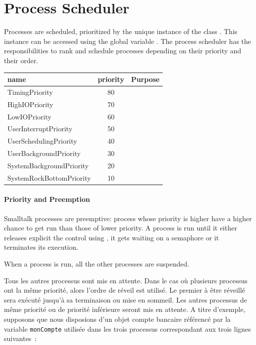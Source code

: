 \documentclass[a4paper,10pt,twoside]{book}
\begin{document}
\section{Process Scheduler}

Processes are scheduled, \ie prioritized by the unique instance of the class . This instance can be accessed using the global variable
. The process scheduler has the responsibilities to rank and schedule processes depending on their priority and their order.

\begin{table}
\begin{tabular}{l|c|c}
	name& priority & Purpose\\ \hline
	TimingPriority&80&\\ 
	HighIOPriority&70&\\ 
	LowIOPriority&60&\\ 
	UserInterruptPriority&50&\\
	UserSchedulingPriority&40\\
	UserBackgroundPriority&30&\\ 
	SystemBackgroundPriority&20&\\ 
	SystemRockBottomPriority&10&\\ \hline
\end{tabular}
\end{table}

\paragraph{Priority and Preemption}
Smalltalk processes are preemptive: process whose priority is higher have a higher chance to get run than those of lower priority. A process is run until it either releases explicit the control using , it gets waiting on a semaphore or it terminates its execution. 

When a process is run, all the other processes are suspended. 


Tous les autres processus sont mis en attente. Dans le cas où plusieurs processus
ont la même priorité, alors l'ordre de réveil est utilisé. Le premier à être réveillé sera exécuté jusqu'à sa terminaison ou mise en sommeil. Les autres processus de même priorité ou de priorité inférieure seront mis en attente.
A titre d'exemple, supposons que nous disposions d'un objet compte bancaire référencé par la variable \verb!monCompte! utilisée dans les trois processus correspondant aux trois lignes suivantes~:
\end{document}
